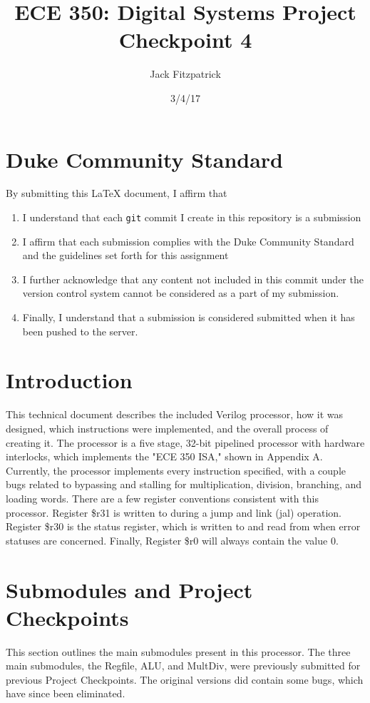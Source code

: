 \documentclass[letterpaper]{article} %
\begin{document}
\title{ECE 350: Digital Systems Project Checkpoint 4}
\author{Jack Fitzpatrick} %
\date{3/4/17} %
\maketitle

\section*{Duke Community Standard}

By submitting this \LaTeX{} document, I affirm that
\begin{enumerate}
    \item I understand that each \texttt{git} commit I create in this repository is a submission
    \item I affirm that each submission complies with the Duke Community Standard and the guidelines set forth for this assignment
    \item I further acknowledge that any content not included in this commit under the version control system cannot be considered as a part of my submission.
    \item Finally, I understand that a submission is considered submitted when it has been pushed to the server.
\end{enumerate}

\section*{Introduction}
This technical document describes the included Verilog processor, how it was designed, which instructions were implemented, and the overall process of creating it. The processor is a five stage, 32-bit pipelined processor with hardware interlocks, which implements the "ECE 350 ISA," shown in Appendix A. Currently, the processor implements every instruction specified, with a couple bugs related to bypassing and stalling for multiplication, division, branching, and loading words. There are a few register conventions consistent with this processor. Register \$r31 is written to during a jump and link (jal) operation. Register \$r30 is the status register, which is written to and read from when error statuses are concerned. Finally, Register \$r0 will always contain the value 0.
\newpage
\section*{Submodules and Project Checkpoints}
This section outlines the main submodules present in this processor. The three main submodules, the Regfile, ALU, and MultDiv, were previously submitted for previous Project Checkpoints. The original versions did contain some bugs, which have since been eliminated. \\
\end{document}
